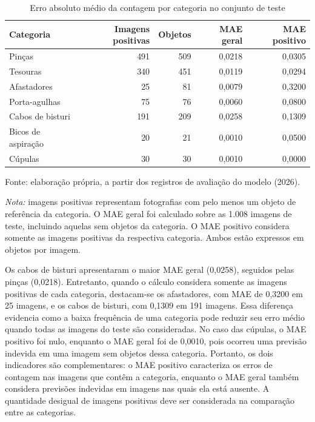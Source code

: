 \begin{table}[htbp]
\centering
\caption{Erro absoluto médio da contagem por categoria no conjunto de teste}
\label{tab:res-mae-categorias}

\begin{minipage}{0.98\linewidth}
\singlespacing
\small
\centering

\begin{tabular}{lrrrr}
\hline
Categoria & Imagens positivas & Objetos & MAE geral & MAE positivo \\
\hline
Pinças             & 491 & 509 & 0,0218 & 0,0305 \\
Tesouras           & 340 & 451 & 0,0119 & 0,0294 \\
Afastadores        & 25  & 81  & 0,0079 & 0,3200 \\
Porta-agulhas      & 75  & 76  & 0,0060 & 0,0800 \\
Cabos de bisturi   & 191 & 209 & 0,0258 & 0,1309 \\
Bicos de aspiração & 20  & 21  & 0,0010 & 0,0500 \\
Cúpulas            & 30  & 30  & 0,0010 & 0,0000 \\
\hline
\end{tabular}

\par
\vspace{0.35em}
\raggedright
\footnotesize

Fonte: elaboração própria, a partir dos registros de avaliação do modelo (2026).

\par\vspace{0.25em}

\textit{Nota:} imagens positivas representam fotografias com pelo menos um objeto de referência da categoria. O MAE geral foi calculado sobre as 1.008 imagens de teste, incluindo aquelas sem objetos da categoria. O MAE positivo considera somente as imagens positivas da respectiva categoria. Ambos estão expressos em objetos por imagem.

\end{minipage}
\end{table}



Os cabos de bisturi apresentaram o maior MAE geral (0,0258), seguidos pelas pinças (0,0218). Entretanto, quando o cálculo considera somente as imagens positivas de cada categoria, destacam-se os afastadores, com MAE de 0,3200 em 25 imagens, e os cabos de bisturi, com 0,1309 em 191 imagens. Essa diferença evidencia como a baixa frequência de uma categoria pode reduzir seu erro médio quando todas as imagens do teste são consideradas. No caso das cúpulas, o MAE positivo foi nulo, enquanto o MAE geral foi de 0,0010, pois ocorreu uma previsão indevida em uma imagem sem objetos dessa categoria. Portanto, os dois indicadores são complementares: o MAE positivo caracteriza os erros de contagem nas imagens que contêm a categoria, enquanto o MAE geral também considera previsões indevidas em imagens nas quais ela está ausente. A quantidade desigual de imagens positivas deve ser considerada na comparação entre as categorias.


